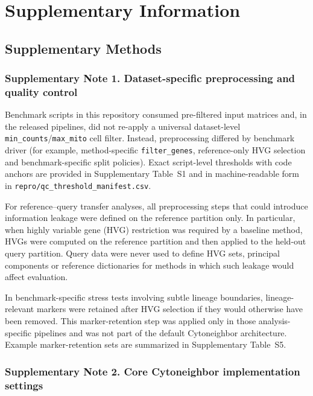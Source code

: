 \documentclass[11pt]{article}
\begin{document}
\section*{Supplementary Information}

\subsection*{Supplementary Methods}

\subsubsection*{Supplementary Note 1. Dataset-specific preprocessing and quality control}

Benchmark scripts in this repository consumed pre-filtered input matrices and, in the released pipelines, did not re-apply a universal dataset-level \texttt{min\_counts}/\texttt{max\_mito} cell filter. Instead, preprocessing differed by benchmark driver (for example, method-specific \texttt{filter\_genes}, reference-only HVG selection and benchmark-specific split policies). Exact script-level thresholds with code anchors are provided in Supplementary Table~S1 and in machine-readable form in \texttt{repro/qc\_threshold\_manifest.csv}.

For reference--query transfer analyses, all preprocessing steps that could introduce information leakage were defined on the reference partition only. In particular, when highly variable gene (HVG) restriction was required by a baseline method, HVGs were computed on the reference partition and then applied to the held-out query partition. Query data were never used to define HVG sets, principal components or reference dictionaries for methods in which such leakage would affect evaluation.

In benchmark-specific stress tests involving subtle lineage boundaries, lineage-relevant markers were retained after HVG selection if they would otherwise have been removed. This marker-retention step was applied only in those analysis-specific pipelines and was not part of the default Cytoneighbor architecture. Example marker-retention sets are summarized in Supplementary Table~S5.

\subsubsection*{Supplementary Note 2. Core Cytoneighbor implementation settings}
\end{document}
